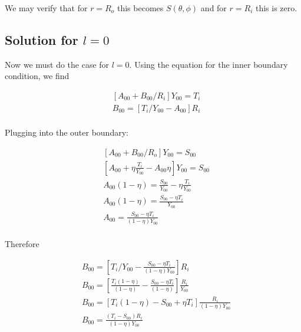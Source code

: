 \documentclass[a4paper,10pt]{article}
\begin{document}
We may verify that for $r = R_o$ this becomes $S(\theta, \phi)$ and for $r=R_i$ this is zero.

\subsection{Solution for $l=0$}


Now we must do the case for $l=0$.  Using the equation for the inner boundary condition, we find 

\begin{equation}
\begin{aligned}
& \left[A_{00} + B_{00}/R_i \right] Y_{00} = T_i \\
& B_{00} = \left[T_i/Y_{00} - A_{00} \right] R_i\\
\end{aligned}
\end{equation}

Plugging into the outer boundary:

\begin{equation}
\begin{aligned}
& \left[A_{00} + B_{00}/R_o \right] Y_{00} = S_{00} \\
& \left[A_{00} +  \eta \frac{T_i}{Y_{00}} - A_{00} \eta \right]  Y_{00} = S_{00}\\
& A_{00} (1-\eta) = \frac{S_{00}}{Y_{00}} - \eta \frac{T_i}{Y_{00}} \\
& A_{00} (1-\eta) = \frac{S_{00} - \eta T_i}{Y_{00}} \\
& A_{00} = \frac{S_{00} - \eta T_i}{(1-\eta)Y_{00}} \\
\end{aligned}
\end{equation}

Therefore

\begin{equation}
\begin{aligned}
& B_{00} = \left[T_i/Y_{00} - \frac{ S_{00} - \eta T_i}{(1-\eta) Y_{00} }  \right] R_i\\
& B_{00} = \left[\frac{T_i (1-\eta)}{(1-\eta)} - \frac{ S_{00} - \eta T_i}{(1-\eta) }  \right] \frac{R_i}{Y_{00}}\\
& B_{00} = \left[T_i (1-\eta) - S_{00} + \eta T_i  \right] \frac{R_i}{(1-\eta) Y_{00}}\\
& B_{00} = \frac{(T_i-S_{00}) R_i}{(1-\eta) Y_{00}}\\
\end{aligned}
\end{equation}
\end{document}
